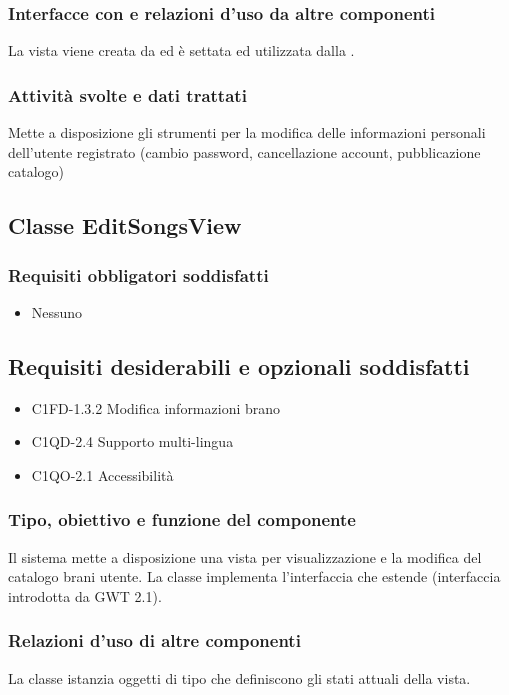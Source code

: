\subsubsection*{Interfacce con e relazioni d'uso da altre componenti}
La vista viene creata da  ed \`e settata ed utilizzata dalla
.
\subsubsection*{Attivit\`a svolte e dati trattati}
Mette a disposizione gli strumenti per la modifica delle informazioni personali
dell'utente registrato (cambio password, cancellazione account,
pubblicazione catalogo)

\subsection{Classe EditSongsView}
\subsubsection*{Requisiti obbligatori soddisfatti}
\begin{itemize}
    \item Nessuno
\end{itemize}
\subsection*{Requisiti desiderabili e opzionali soddisfatti}
\begin{itemize}
    \item C1FD-1.3.2 Modifica informazioni brano
    \item C1QD-2.4 Supporto multi-lingua
    \item C1QO-2.1 Accessibilit\`a
\end{itemize}
\subsubsection*{Tipo, obiettivo e funzione del componente}
Il sistema mette a disposizione una vista per visualizzazione e la modifica del
catalogo brani utente. La classe  implementa l'interfaccia
 che estende  (interfaccia introdotta da GWT
2.1).
\subsubsection*{Relazioni d'uso di altre componenti}
La classe istanzia oggetti di tipo  che definiscono gli stati
attuali della vista.
